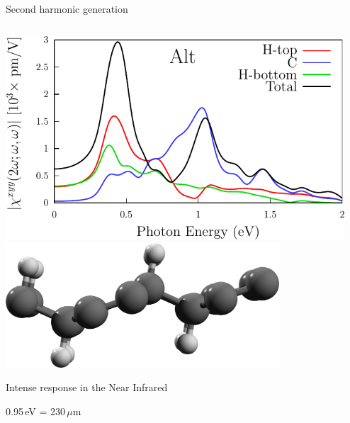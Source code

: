 \documentclass{beamer}
\begin{document}
\begin{frame}

\begin{center}
{\Large Second harmonic generation}
\end{center}

\begin{columns}

\begin{center}
\small

\includegraphics[width=0.99\textwidth]{figs/plots/shg-lay-alt.pdf}
\vspace{3mm}
\includegraphics[width=0.8\textwidth]{figs/alt2.png}

Intense response in the Near Infrared

0.95\,eV = 230\,$\mu$m

\end{center}

\begin{center}
\small 


\end{center}
\end{columns}
\end{frame}
\end{document}
